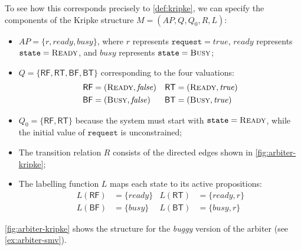 \begin{example}
To see how this corresponds precisely to \cref{def:kripke}, we can specify the components of the Kripke structure $M = (AP, Q, Q_0, R, L)$:
\begin{itemize}
  \item $AP = \{ r, \mathit{ready}, \mathit{busy} \}$, where $r$ represents $\texttt{request} = \mathit{true}$, $\mathit{ready}$ represents $\texttt{state} = \textsc{Ready}$, and $\mathit{busy}$ represents $\texttt{state} = \textsc{Busy}$;
  \item $Q = \{ \textsf{RF}, \textsf{RT}, \textsf{BF}, \textsf{BT} \}$ corresponding to the four valuations:
        \begin{align*}
          \textsf{RF} &= (\textsc{Ready}, \mathit{false}) & \textsf{RT} &= (\textsc{Ready}, \mathit{true}) \\
          \textsf{BF} &= (\textsc{Busy}, \mathit{false})  & \textsf{BT} &= (\textsc{Busy}, \mathit{true})
        \end{align*}
  \item $Q_0 = \{ \textsf{RF}, \textsf{RT} \}$ because the system must start with $\texttt{state} = \textsc{Ready}$, while the initial value of $\texttt{request}$ is unconstrained;
  \item The transition relation $R$ consists of the directed edges shown in \cref{fig:arbiter-kripke};
  \item The labelling function $L$ maps each state to its active propositions:
        \begin{align*}
          L(\textsf{RF}) &= \{ \mathit{ready} \} & L(\textsf{RT}) &= \{ \mathit{ready}, r \} \\
          L(\textsf{BF}) &= \{ \mathit{busy} \}  & L(\textsf{BT}) &= \{ \mathit{busy}, r \}
        \end{align*}
\end{itemize}
\cref{fig:arbiter-kripke} shows the structure for the \emph{buggy} version of the arbiter (see \cref{ex:arbiter-smv}).
\end{example}


